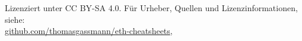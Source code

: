 
\begin{center}
    Lizenziert unter CC BY-SA 4.0. Für Urheber, Quellen und Lizenzinformationen, siehe:\\
    \href{https://github.com/thomasgassmann/eth-cheatsheets}{github.com/thomasgassmann/eth-cheatsheets}, 
\end{center}
